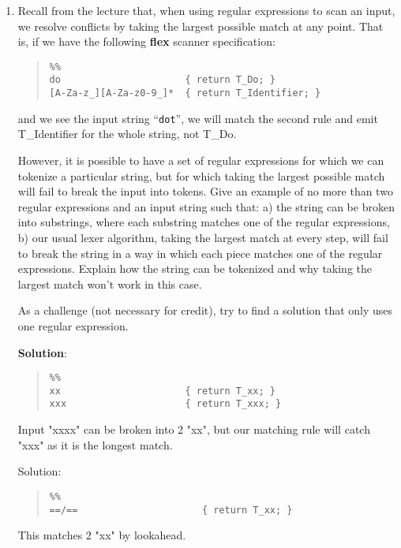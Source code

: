 \documentclass[11pt]{article}
\begin{document}
\begin{enumerate}
\newpage

\item Recall from the lecture that, when using regular expressions to scan an input, we resolve conflicts by taking the largest possible match at any point. That is, if we have the following \textbf{flex} scanner specification:
\begin{quote}
\begin{lstlisting}
%%
do                      { return T_Do; }
[A-Za-z_][A-Za-z0-9_]*  { return T_Identifier; }
\end{lstlisting}
\end{quote}
and we see the input string ``\texttt{dot}'', we will match the second rule and emit T\_Identifier for the whole string, not T\_Do.

However, it is possible to have a set of regular expressions for which we can tokenize a particular string, but for which taking the largest possible match will fail to break the input into tokens. Give an example of no more than two regular expressions and an input string such that: a) the string can be broken into substrings, where each substring matches one of the regular expressions, b) our usual lexer algorithm, taking the largest match at every step, will fail to break the string in a way in which each piece matches one of the regular expressions. Explain how the string can be tokenized and why taking the largest match won't work in this case.

As a challenge (not necessary for credit), try to find a solution that only uses one regular expression.

\textbf{Solution}: %
\begin{quote}
\begin{lstlisting}
%%
xx                      { return T_xx; }
xxx                     { return T_xxx; }
\end{lstlisting}
\end{quote}

Input "xxxx" can be broken into 2 "xx", but our matching rule will catch "xxx" as it is the longest match.

Solution:
\begin{quote}
\begin{lstlisting}
%%
==/==                      { return T_xx; }
\end{lstlisting}
\end{quote}
This matches 2 "xx" by lookahead.
\end{enumerate}
\end{document}
